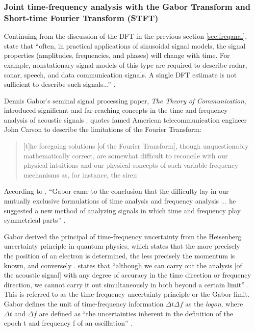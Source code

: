 \documentclass[report.tex]{subfiles}
\begin{document}
\newpagefill

\subsubsection{Joint time-frequency analysis with the Gabor Transform and Short-time Fourier Transform (STFT)}
\label{sec:jointtfa}

Continuing from the discussion of the DFT in the previous section \ref{sec:freqanal},\citeauthor{discretebook} state that ``often, in practical applications of sinusoidal signal models, the signal properties (amplitudes, frequencies, and phases) will change with time. For example, nonstationary signal models of this type are required to describe radar, sonar, speech, and data communication signals. A single DFT estimate is not sufficient to describe such signals...'' \parencite[714]{discretebook}.

Dennis Gabor's seminal signal processing paper, \textit{The Theory of Communication}, introduced significant and far-reaching concepts in the time and frequency analysis of acoustic signals \parencite{gabor1946}. \citeauthor{gabor1946} quotes famed American telecommunication engineer John Carson \parencite{carsonfamous} to describe the limitations of the Fourier Transform:

\begin{quote}
	[t]he foregoing solutions [of the Fourier Transform], though unquestionably mathematically correct, are somewhat difficult to reconcile with our physical intuitions and our physical concepts of such variable frequency mechanisms as, for instance, the siren \parencite[431]{gabor1946}
\end{quote}

According to \citeauthor{korpel}, ``Gabor came to the conclusion that the difficulty lay in our mutually exclusive formulations of time analysis and frequency analysis ... he suggested a new method of analyzing signals in which time and frequency play symmetrical parts'' \parencite[3,624]{korpel}.

Gabor derived the principal of time-frequency uncertainty from the Heisenberg uncertainty principle in quantum physics, which states that the more precisely the position of an electron is determined, the less precisely the momentum is known, and conversely . \citeauthor{gabor1946} states that ``although we can carry out the analysis [of the acoustic signal] with any degree of accuracy in the time direction or frequency direction, we cannot carry it out simultaneously in both beyond a certain limit'' \parencite[432]{gabor1946}. This is referred to as the time-frequency uncertainty principle or the Gabor limit. Gabor defines the unit of time-frequency information $\Delta t \Delta f$ as the \textit{logon}, where $\Delta t$ and $\Delta f$ are defined as ``the uncertainties inherent in the definition of the epoch t and frequency f of an oscillation'' \parencite[432]{gabor1946}.
\end{document}
